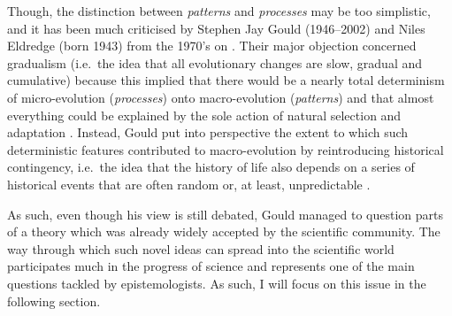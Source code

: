 Though, the distinction between \textit{patterns} and \textit{processes} may be too simplistic, and it has been much criticised by Stephen Jay Gould (1946--2002) and Niles Eldredge (born 1943) from the 1970's on \citep[reviewed in][]{dericqles2009quelques}.
Their major objection concerned gradualism (i.e.\ the idea that all evolutionary changes are slow, gradual and cumulative) because this implied that there would be a nearly total determinism of micro-evolution (\textit{processes}) onto macro-evolution (\textit{patterns}) and that almost everything could be explained by the sole action of natural selection and adaptation \citep[reviewed in][]{paulin2015epistemologie}.
Instead, Gould put into perspective the extent to which such deterministic features contributed to macro-evolution by reintroducing historical contingency, i.e.\ the idea that the history of life also depends on a series of historical events that are often random or, at least, unpredictable \citep{gould1989wonderful}.

As such, even though his view is still debated, Gould managed to question parts of a theory which was already widely accepted by the scientific community.
The way through which such novel ideas can spread into the scientific world participates much in the progress of science and represents one of the main questions tackled by epistemologists. 
As such, I will focus on this issue in the following section.













